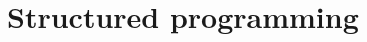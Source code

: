 \documentclass[fsharpnotes.tex]{subfiles}
\begin{document}
\part{Structured programming}
\label{part:structured}
\end{document}
